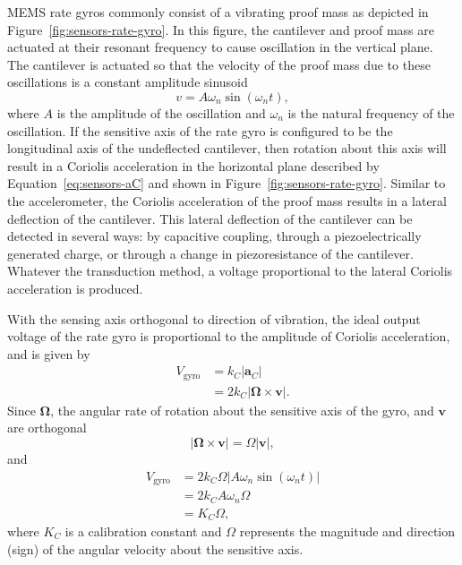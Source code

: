 MEMS rate gyros commonly consist of a vibrating proof mass as depicted in Figure~\ref{fig:sensors-rate-gyro}. In this figure, the cantilever and proof mass are actuated at their resonant frequency to cause oscillation in the vertical plane. The cantilever is actuated so that the velocity of the proof mass due to these oscillations is a constant amplitude sinusoid
\[
v = A\omega_n\sin(\omega_n t) ,
\]
where $A$ is the amplitude of the oscillation and $\omega_n$ is the natural frequency of the oscillation. If the sensitive axis of the rate gyro is configured to be the longitudinal axis of the undeflected cantilever, then rotation about this axis will result in a Coriolis acceleration in the horizontal plane described by Equation~\eqref{eq:sensors-aC} and shown in Figure~\ref{fig:sensors-rate-gyro}. Similar to the accelerometer, the Coriolis acceleration of the proof mass results in a lateral deflection of the cantilever. This lateral deflection of the cantilever can be detected in several ways: by capacitive coupling, through a piezoelectrically generated charge, or through a change in piezoresistance of the cantilever. Whatever the transduction method, a voltage proportional to the lateral Coriolis acceleration is produced.

With the sensing axis orthogonal to direction of vibration, the ideal output voltage of the rate gyro is proportional to the amplitude of Coriolis acceleration, and is given by
\begin{align*}
	V_{\text{gyro}} &= k_C |\mathbf{a}_C| \\
	&= 2 k_C |\boldsymbol{\Omega} \times \mathbf{v}|.
\end{align*}
Since $\boldsymbol{\Omega}$, the angular rate of rotation about the sensitive axis of the gyro, and $\mathbf{v}$ are orthogonal
\[
  |\boldsymbol{\Omega} \times \mathbf{v}| = \Omega |\mathbf{v}| ,
\]
and
\begin{align*}
	V_{\text{gyro}} &= 2 k_C \Omega |A\omega_n\sin(\omega_n t)| \\
	&= 2 k_C A \omega_n \Omega\\
	&= K_C \Omega ,
\end{align*}
where $K_C$ is a calibration constant and $\Omega$ represents the magnitude and direction (sign) of the angular velocity about the sensitive axis.

